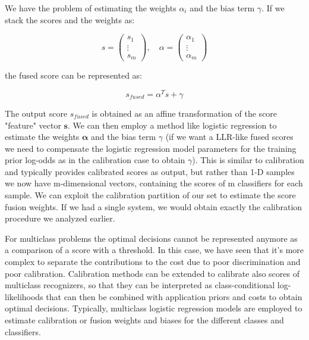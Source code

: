 We have the problem of estimating the weights $\alpha_i$ and the bias term $\gamma$. If we stack the scores and the weights as:

\begin{equation*}
s = \begin{pmatrix} s_1 \\ \vdots \\ s_m \end{pmatrix}, \quad \alpha = \begin{pmatrix} \alpha_1 \\ \vdots \\ \alpha_m \end{pmatrix}
\end{equation*}

the fused score can be represented as:

\begin{equation*}
s_{fused} = \alpha^T s + \gamma
\end{equation*}

The output score $s_{fused}$ is obtained as an affine transformation of the score "feature" vector $\mathbf{s}$. We can then employ a method like logistic regression to estimate the weights $\boldsymbol{\alpha}$ and the bias term $\gamma$ (if we want a LLR-like fused scores we need to compensate the logistic regression model parameters for the training prior log-odds as in the calibration case to obtain $\gamma$). This is similar to calibration and typically provides calibrated scores as output, but rather than 1-D samples we now have m-dimensional vectors, containing the scores of m classifiers for each sample. We can exploit the calibration partition of our set to estimate the score fusion weights. If we had a single system, we would obtain exactly the calibration procedure we analyzed earlier.

For multiclass problems the optimal decisions cannot be represented anymore as a comparison of a score with a threshold. In this case, we have seen that it's more complex to separate the contributions to the cost due to poor discrimination and poor calibration. Calibration methods can be extended to calibrate also scores of multiclass recognizers, so that they can be interpreted as class-conditional log-likelihoods that can then be combined with application priors and costs to obtain optimal decisions. Typically, multiclass logistic regression models are employed to estimate calibration or fusion weights and biases for the different classes and classifiers.
